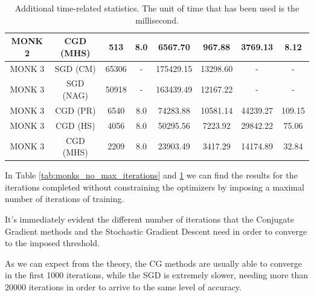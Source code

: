 \begin{table}[H]
\begin{subtable}{\textwidth}
{\begin{tabular}{| c | c | c | c | c | c | c | c |}
                            \hline
                             MONK 2 &  CGD (MHS) &               513 &            8.0 &       6567.70 &    967.88 &   3769.13 &      8.12 \\
                            \hline
                            \hline
                             MONK 3 &   SGD (CM) &             65306 &              - &     175429.15 &  13298.60 &         - &         - \\
                            \hline
                             MONK 3 &  SGD (NAG) &             50918 &              - &     163439.49 &  12167.22 &         - &         - \\
                            \hline
                             MONK 3 &   CGD (PR) &              6540 &            8.0 &      74283.88 &  10581.14 &  44239.27 &    109.15 \\
                            \hline
                             MONK 3 &   CGD (HS) &              4056 &            8.0 &      50295.56 &   7223.92 &  29842.22 &     75.06 \\
                            \hline
                            \rowcolor[gray]{.9}
                             MONK 3 &  CGD (MHS) &              2209 &            8.0 &      23903.49 &   3417.29 &  14174.89 &     32.84 \\
                            \hline
                            \end{tabular}

                    }
                \end{subtable}
                \caption{Additional time-related statistics. The unit of time that has been used is the
                millisecond.}
                \label{tab:monks_additional_no_max_iterations}
            \end{table}

            In Table \ref{tab:monks_no_max_iterations} and \ref{tab:monks_additional_no_max_iterations}   we can find the results for the iterations completed without
            constraining the optimizers by imposing a maximal number of iterations of training.

            It's immediately evident the different number of iterations that the Conjugate Gradient methods and the Stochastic Gradient Descent need in order to converge to the imposed threshold.

            As we can expect from the theory, the CG methods are usually able to converge in the first 1000 iterations, while the SGD is extremely slower, needing more than 20000 iterations in order to arrive to the same level of accuracy.

